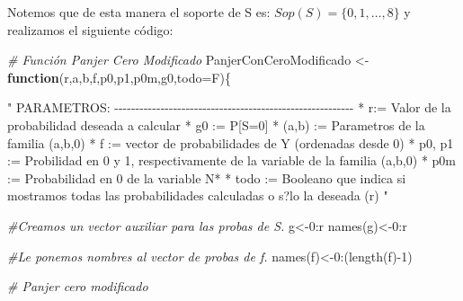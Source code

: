 \documentclass[
]{article}
\newenvironment{Shaded}{\begin{snugshade}}{\end{snugshade}}
\newcommand{\AttributeTok}[1]{\textcolor[rgb]{0.77,0.63,0.00}{#1}}
\newcommand{\CommentTok}[1]{\textcolor[rgb]{0.56,0.35,0.01}{\textit{#1}}}
\newcommand{\ControlFlowTok}[1]{\textcolor[rgb]{0.13,0.29,0.53}{\textbf{#1}}}
\newcommand{\DecValTok}[1]{\textcolor[rgb]{0.00,0.00,0.81}{#1}}
\newcommand{\FunctionTok}[1]{\textcolor[rgb]{0.00,0.00,0.00}{#1}}
\newcommand{\NormalTok}[1]{#1}
\newcommand{\OtherTok}[1]{\textcolor[rgb]{0.56,0.35,0.01}{#1}}
\newcommand{\SpecialCharTok}[1]{\textcolor[rgb]{0.00,0.00,0.00}{#1}}
\newcommand{\StringTok}[1]{\textcolor[rgb]{0.31,0.60,0.02}{#1}}
\begin{document}
Notemos que de esta manera el soporte de S es:
\(Sop(S) = \{0,1, \dots, 8\}\) y realizamos el siguiente código:

\begin{Shaded}
\begin{Highlighting}[]
\CommentTok{\# Función Panjer Cero Modificado}
\NormalTok{PanjerConCeroModificado }\OtherTok{\textless{}{-}} \ControlFlowTok{function}\NormalTok{(r,a,b,f,p0,p1,p0m,g0,}\AttributeTok{todo=}\NormalTok{F)\{}
  
  \StringTok{"}
\StringTok{  PARAMETROS:}
\StringTok{  {-}{-}{-}{-}{-}{-}{-}{-}{-}{-}{-}{-}{-}{-}{-}{-}{-}{-}{-}{-}{-}{-}{-}{-}{-}{-}{-}{-}{-}{-}{-}{-}{-}{-}{-}{-}{-}{-}{-}{-}{-}{-}{-}{-}{-}{-}{-}{-}{-}{-}{-}{-}{-}{-}{-}{-}{-}}
\StringTok{  * r:= Valor de la probabilidad deseada a calcular}
\StringTok{  * g0 := P[S=0]}
\StringTok{  * (a,b) := Parametros de la familia (a,b,0)}
\StringTok{  * f := vector de probabilidades de Y (ordenadas desde 0)}
\StringTok{  * p0, p1 := Probilidad en 0 y 1, respectivamente de la}
\StringTok{  variable de la familia (a,b,0)}
\StringTok{  * p0m := Probabilidad en 0 de la variable N*}
\StringTok{  * todo := Booleano que indica si mostramos todas las}
\StringTok{  probabilidades calculadas o s?lo la deseada (r)}
\StringTok{  "}
  
  \CommentTok{\#Creamos un vector auxiliar para las probas de S.}
\NormalTok{  g}\OtherTok{\textless{}{-}}\DecValTok{0}\SpecialCharTok{:}\NormalTok{r}
  \FunctionTok{names}\NormalTok{(g)}\OtherTok{\textless{}{-}}\DecValTok{0}\SpecialCharTok{:}\NormalTok{r}
  
  \CommentTok{\#Le ponemos nombres al vector de probas de f.}
  \FunctionTok{names}\NormalTok{(f)}\OtherTok{\textless{}{-}}\DecValTok{0}\SpecialCharTok{:}\NormalTok{(}\FunctionTok{length}\NormalTok{(f)}\SpecialCharTok{{-}}\DecValTok{1}\NormalTok{)}
  
  \CommentTok{\# Panjer cero modificado}
  

\end{Highlighting}
\end{Shaded}
\end{document}
